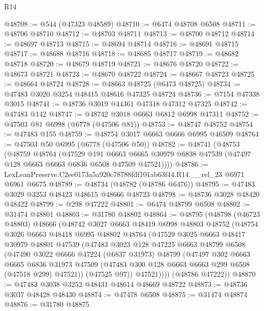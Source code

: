 \begin{lexlean}{R14}
\begin{coremodule}
@48708 := @544 (@47323 @48589)
@48710 := @6474 @48708 @6508
@48711 := @48706 @48710
@48712 := @48703 @48711
@48713 := @48700 @48712
@48714 := @48697 @48713
@48715 := @48694 @48714
@48716 := @48691 @48715
@48717 := @48688 @48716
@48718 := @48685 @48717
@48719 := @48682 @48718
@48720 := @48679 @48719
@48721 := @48676 @48720
@48722 := @48673 @48721
@48723 := @48670 @48722
@48724 := @48667 @48723
@48725 := @48664 @48724
@48728 := @48663 @48725 (@6473 @48725)
@48734 := @47483 @3020 @3254 @48415 @48616 @47325 @48724
@48736 := @7154 @47338 @3015
@48741 := @48736 @3019 @44361 @47318 @47312 @47325
@48742 := @47483 @142
@48747 := @48742 @3018 @6663 @6812 @6998 @47311
@48752 := @47503 @81 @6998 (@6778 (@47506 @81))
@48753 := @48747 @48752
@48754 := @47483 @155
@48759 := @48754 @3017 @6663 @6666 @6995 @46509
@48764 := @47503 @50 @6995 (@6778 (@47506 @50))
@48782 := @48741
    (@48753
      (@48759
        @48764
        (@47529
          @191
          @6663
          @6665
          @30979
          @6838
          @47539
          (@47497 @128 @6663 @6663 @6836 @6508 @47509 @47521))))
@48786 := LexLeanPreserve.C2ee0173a5a920c78788fdf101ab63f44.R14.__rel_23 @6971 @6961 @6675
@48789 := @48734 (@48782 (@48786 @6476))
@48795 := @47483 @3029 @3253 @48423 @48615 @48666 @48723
@48798 := @48736 @3028 @48420 @48422
@48799 := @298 @47222
@48801 := @6474 @48799 @6508
@48802 := @31474 @48801
@48803 := @31780 @48802
@48864 := @48795
    (@48798
      (@46723 @48803)
      @48666
      (@48742
        @3027
        @6663
        @48419
        @6998
        @48803
        @48752
        (@48754
          @3026
          @6663
          @48418
          @6995
          @48802
          @48764
          (@47529
            @3025
            @6663
            @48417
            @30979
            @48801
            @47539
            (@47483
              @3023
              @128
              @47225
              @6663
              @48799
              @6508
              (@47490
                @3022
                @6666
                @47224
                (@6837 @31973)
                @48799
                (@47497
                  @302
                  @6663
                  @6665
                  @6836
                  @31973
                  @47509
                  (@47483 @300 @128 @6663 @6663 @299 @6508 (@47518 @299) @47521))
                (@47525 @97))
              @47521))))
      (@48786 @47222))
@48870 := @47483 @3038 @3252 @48431 @48614 @48669 @48722
@48873 := @48736 @3037 @48428 @48430
@48874 := @47478 @6508
@48875 := @31474 @48874
@48876 := @31780 @48875

\end{coremodule}
\end{lexlean}
